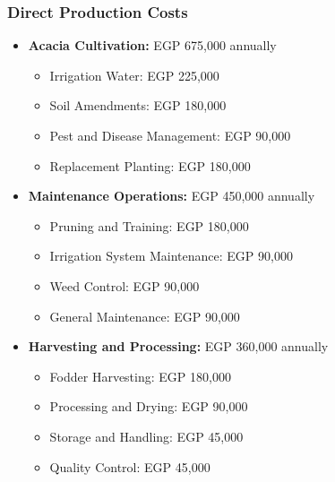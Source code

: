 \subsubsection{Direct Production Costs}
\begin{itemize}
    \item \textbf{Acacia Cultivation:} EGP 675,000 annually
    \begin{itemize}
        \item Irrigation Water: EGP 225,000
        \item Soil Amendments: EGP 180,000
        \item Pest and Disease Management: EGP 90,000
        \item Replacement Planting: EGP 180,000
    \end{itemize}
    
    \item \textbf{Maintenance Operations:} EGP 450,000 annually
    \begin{itemize}
        \item Pruning and Training: EGP 180,000
        \item Irrigation System Maintenance: EGP 90,000
        \item Weed Control: EGP 90,000
        \item General Maintenance: EGP 90,000
    \end{itemize}
    
    \item \textbf{Harvesting and Processing:} EGP 360,000 annually
    \begin{itemize}
        \item Fodder Harvesting: EGP 180,000
        \item Processing and Drying: EGP 90,000
        \item Storage and Handling: EGP 45,000
        \item Quality Control: EGP 45,000
    \end{itemize}
\end{itemize}

